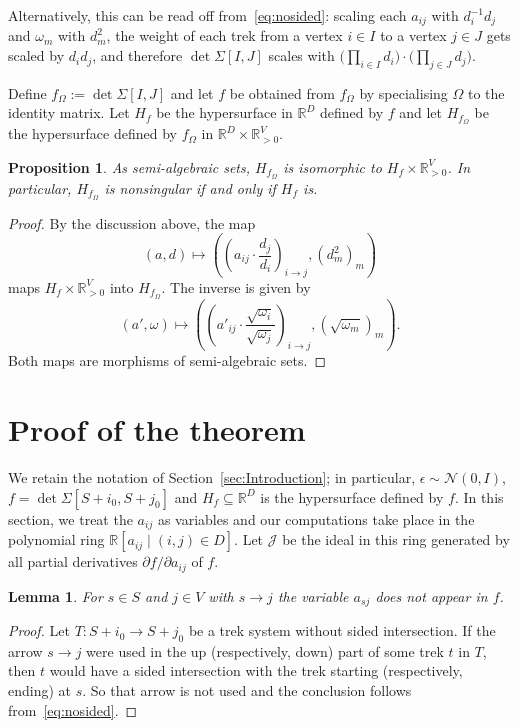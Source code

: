 \documentclass[10pt]{amsart}
\newtheorem{lemm}[theo]{Lemma}
\newtheorem{prop}[theo]{Proposition}
\theoremstyle{definition}
\newcommand{\RR}{\mathbb{R}}
\newcommand{\cJ}{\mathcal{J}}
\begin{document}
Alternatively, this can be read off from~\eqref{eq:nosided}: scaling each $a_{ij}$ with $d_i^{-1} d_j$ and $\omega_m$ with $d_m^2$, the weight of each trek from a vertex $i \in I$ to a vertex $j \in J$ gets scaled by $d_i d_j$, and therefore $\det \Sigma[I,J]$ scales with $\big(\prod_{i \in I} d_i \big) \cdot \big(\prod_{j \in J} d_j\big)$.

Define $f_{\Omega}:=\det \Sigma[I,J]$ and let $f$ be obtained from $f_{\Omega}$ by specialising $\Omega$ to the identity matrix. Let $H_f$ be the hypersurface in $\RR^D$ defined by $f$ and let $H_{f_\Omega}$ be the hypersurface defined by $f_\Omega$ in $\RR^D \times \RR_{>0}^V$.

\begin{prop}\label{prop:unequal}
As semi-algebraic sets, $H_{f_\Omega}$ is isomorphic to $H_f \times
\RR_{>0}^V$. In particular, $H_{f_\Omega}$ is nonsingular if and only if $H_f$ is.
\end{prop}

\begin{proof}
By the discussion above, the map
\[
(a,d) \mapsto \left(\left(a_{ij} \cdot \frac{d_j}{d_i}\right)_{i \to j}, (d_m^2)_m\right)
\]
maps $H_f \times \RR_{>0}^V$ into $H_{f_\Omega}$. The inverse is given by
\[
(a',\omega) \mapsto \left(\left(a'_{ij} \cdot \frac{\sqrt{\omega_i}}{\sqrt{\omega_j}}\right)_{i \to j}, (\sqrt{\omega_m})_m \right).
\]
Both maps are morphisms of semi-algebraic sets.
\end{proof}


\section{Proof of the theorem} \label{sec:Proof}

We retain the notation of Section~\ref{sec:Introduction}; in particular, $\epsilon \sim \mathcal{N}(0,I)$, $f=\det \Sigma[S+i_0,S+j_0]$ and $H_f
\subseteq \RR^D$ is the hypersurface defined by $f$. In this section, we treat the $a_{ij}$ as variables and our computations take place in the polynomial ring $\RR[a_{ij} \mid (i,j) \in D]$. Let $\cJ$ be the ideal in this ring generated by all partial derivatives $\partial f/\partial a_{ij}$ of $f$.

\begin{lemm}\label{lm:sj}
For $s \in S$ and $j \in V$ with $s \to j$ the variable $a_{sj}$ does not appear in $f$.
\end{lemm}

\begin{proof}
Let $T:S+i_0 \to S+j_0$ be a trek system without sided intersection. If the arrow $s \to j$ were used in the up (respectively, down) part of some trek $t$ in $T$, then $t$ would have a sided intersection with the trek starting (respectively, ending) at $s$. So that arrow is not used and the conclusion follows from~\eqref{eq:nosided}.
\end{proof}
\end{document}
